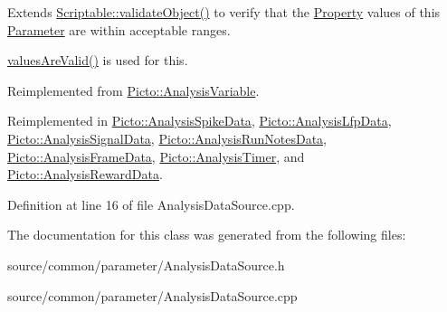 Extends \hyperlink{class_picto_1_1_scriptable_ab6e2944c43a3b5d418bf7b251594386d}{Scriptable\-::validate\-Object()} to verify that the \hyperlink{class_picto_1_1_property}{Property} values of this \hyperlink{class_picto_1_1_parameter}{Parameter} are within acceptable ranges. 

\hyperlink{class_picto_1_1_parameter_a3443808da4c3edf26f2c3c3772d95b10}{values\-Are\-Valid()} is used for this. 

Reimplemented from \hyperlink{class_picto_1_1_analysis_variable_a4279b4c9eca4a7ef60de8e4db91dc6f3}{Picto\-::\-Analysis\-Variable}.



Reimplemented in \hyperlink{class_picto_1_1_analysis_spike_data_a3e7553a7a5af76724b70500418e1fe25}{Picto\-::\-Analysis\-Spike\-Data}, \hyperlink{class_picto_1_1_analysis_lfp_data_ae53fa1010780d301a104e613f93dda1a}{Picto\-::\-Analysis\-Lfp\-Data}, \hyperlink{class_picto_1_1_analysis_signal_data_a1e2a5e3c64e9b456e5074baec23e0cf6}{Picto\-::\-Analysis\-Signal\-Data}, \hyperlink{class_picto_1_1_analysis_run_notes_data_ae58942e718660c9caeb73d2dab934540}{Picto\-::\-Analysis\-Run\-Notes\-Data}, \hyperlink{class_picto_1_1_analysis_frame_data_a935dac68ae9c34e8faddcfabff4ff4be}{Picto\-::\-Analysis\-Frame\-Data}, \hyperlink{class_picto_1_1_analysis_timer_ac3e36dbc727da6f3aa6304b4d1878e3d}{Picto\-::\-Analysis\-Timer}, and \hyperlink{class_picto_1_1_analysis_reward_data_a04595898ba52980c6f48755178c546ee}{Picto\-::\-Analysis\-Reward\-Data}.



Definition at line 16 of file Analysis\-Data\-Source.\-cpp.



The documentation for this class was generated from the following files\-:\begin{DoxyCompactItemize}
\item 
source/common/parameter/Analysis\-Data\-Source.\-h\item 
source/common/parameter/Analysis\-Data\-Source.\-cpp\end{DoxyCompactItemize}
